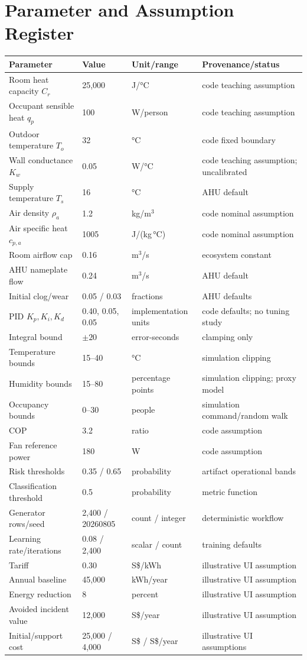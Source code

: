 \chapter{Parameter and Assumption Register}
\label{app:parameters}
\begin{longtable}{L{0.25\textwidth}L{0.16\textwidth}L{0.20\textwidth}L{0.28\textwidth}}
\toprule
Parameter & Value & Unit/range & Provenance/status\\
\midrule
\endhead
Room heat capacity $C_r$ & 25,000 & J/\si{\celsius} & code teaching assumption\\
Occupant sensible heat $q_p$ & 100 & W/person & code teaching assumption\\
Outdoor temperature $T_o$ & 32 & \si{\celsius} & code fixed boundary\\
Wall conductance $K_w$ & 0.05 & W/\si{\celsius} & code teaching assumption; uncalibrated\\
Supply temperature $T_s$ & 16 & \si{\celsius} & AHU default\\
Air density $\rho_a$ & 1.2 & kg/m$^3$ & code nominal assumption\\
Air specific heat $c_{p,a}$ & 1005 & J/(kg\,\si{\celsius}) & code nominal assumption\\
Room airflow cap & 0.16 & m$^3$/s & ecosystem constant\\
AHU nameplate flow & 0.24 & m$^3$/s & AHU default\\
Initial clog/wear & 0.05 / 0.03 & fractions & AHU defaults\\
PID $K_p,K_i,K_d$ & 0.40, 0.05, 0.05 & implementation units & code defaults; no tuning study\\
Integral bound & $\pm20$ & error-seconds & clamping only\\
Temperature bounds & 15--40 & \si{\celsius} & simulation clipping\\
Humidity bounds & 15--80 & percentage points & simulation clipping; proxy model\\
Occupancy bounds & 0--30 & people & simulation command/random walk\\
COP & 3.2 & ratio & code assumption\\
Fan reference power & 180 & W & code assumption\\
Risk thresholds & 0.35 / 0.65 & probability & artifact operational bands\\
Classification threshold & 0.5 & probability & metric function\\
Generator rows/seed & 2,400 / 20260805 & count / integer & deterministic workflow\\
Learning rate/iterations & 0.08 / 2,400 & scalar / count & training defaults\\
Tariff & 0.30 & S\$/kWh & illustrative UI assumption\\
Annual baseline & 45,000 & kWh/year & illustrative UI assumption\\
Energy reduction & 8 & percent & illustrative UI assumption\\
Avoided incident value & 12,000 & S\$/year & illustrative UI assumption\\
Initial/support cost & 25,000 / 4,000 & S\$ / S\$/year & illustrative UI assumptions\\
\bottomrule
\end{longtable}
